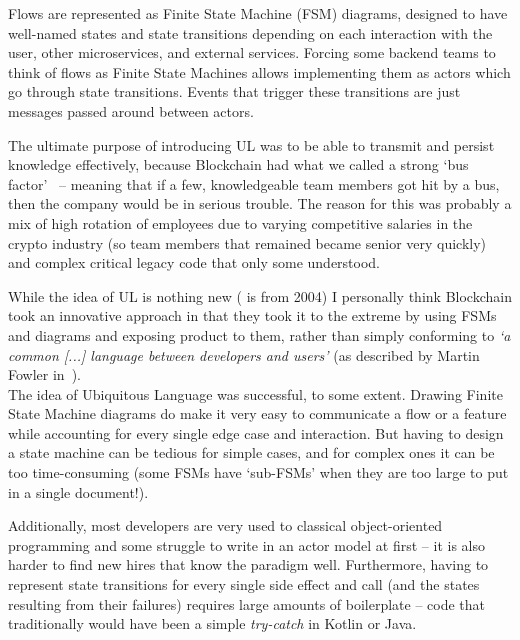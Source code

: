 \documentclass[conference]{IEEEtran}
\begin{document}
    Flows are represented as Finite State Machine (FSM) diagrams, designed to have well-named states and
    state transitions depending on each interaction with the user, other microservices, and external
    services.
    Forcing some backend teams to think of flows as Finite State Machines allows implementing
    them as actors which go through state transitions.
    Events that trigger these transitions are just messages passed around between actors.

    The ultimate purpose of introducing UL was to be able to transmit and persist knowledge
    effectively, because Blockchain had what we called a strong `bus
    factor'~\cite{bowlerTruckFactor} -- meaning that if a few, knowledgeable team members got hit by
    a bus, then the company would be in serious trouble.
    The reason for this was probably a mix of high rotation of employees due to varying competitive
    salaries in the crypto industry (so team members that remained became senior very quickly) and
    complex critical legacy code that only some understood.

    While the idea of UL is nothing new (\cite{evansDomainDrivenDesignUL} is from 2004) I personally
    think Blockchain took an innovative approach in that they took it to the extreme by using FSMs
    and diagrams and exposing product to them, rather than simply conforming to \emph{`a common [...]
        language between developers and users'} (as described by Martin Fowler in~\cite{fowlerUL}).\\

    The idea of Ubiquitous Language was successful, to some extent.
    Drawing Finite State Machine diagrams do make it very easy to communicate a flow or a feature while
    accounting for every single edge case and interaction.
    But having to design a state machine can be tedious for simple cases, and
    for complex ones it can be too time-consuming (some FSMs have `sub-FSMs' when they are too large
    to put in a single document!).

    Additionally, most developers are very used to classical object-oriented programming and some
    struggle to write in an actor model at first -- it is also harder to find new hires that know the
    paradigm well.
    Furthermore, having to represent state transitions for every single side effect and call (and the
    states resulting from their failures) requires large amounts of boilerplate -- code that
    traditionally would have been a simple \emph{try-catch} in Kotlin or Java.
\end{document}

